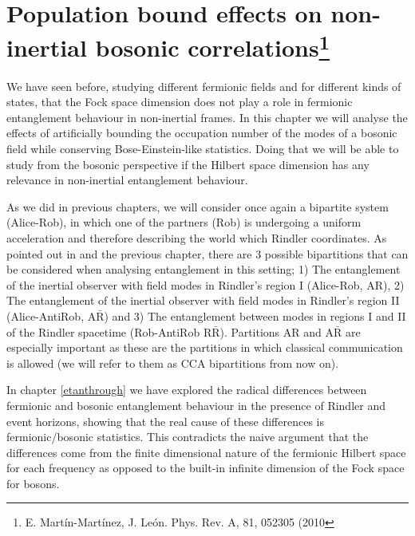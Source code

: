 

\chapter{Population bound effects on non-inertial bosonic correlations\footnote{E. Mart\'in-Mart\'inez, J. Le\'on. Phys. Rev. A, 81, 052305 (2010}}\label{boundedpop}


We have seen before, studying different fermionic fields and for different kinds of states, that the Fock space dimension does not play a role in fermionic entanglement behaviour in non-inertial frames. In this chapter we will analyse the effects of artificially bounding the occupation number of the modes of a bosonic field while conserving Bose-Einstein-like statistics. Doing that we will be able to study from the bosonic perspective if the Hilbert space dimension has any relevance in non-inertial entanglement behaviour.

As we did in previous chapters, we will consider once again a bipartite system (Alice-Rob), in which one of the partners (Rob) is undergoing a uniform acceleration and therefore describing the world which Rindler coordinates. As pointed out in \cite{AlsingSchul} and the previous chapter, there are 3 possible bipartitions that can be considered when analysing entanglement in this setting; 1) The entanglement of the inertial observer with field modes in Rindler's region I (Alice-Rob, AR), 2) The entanglement of the inertial observer with field modes in Rindler's region II (Alice-AntiRob, $\text{A}{\bar{\text{R}}}$) and 3) The entanglement between modes in regions I and II of the Rindler spacetime (Rob-AntiRob $\text{R}{\bar{\text{R}}}$). Partitions AR and $\text{A}{\bar{\text{R}}}$ are especially important as these are the partitions in which classical communication is allowed (we will refer to them as CCA bipartitions from now on).

In chapter \ref{etanthrough} we have explored the radical differences between fermionic and bosonic entanglement behaviour in the presence of Rindler and event horizons, showing that the real cause of these differences is fermionic/bosonic statistics. This contradicts the naive argument that the differences come from the finite dimensional nature of the fermionic Hilbert space for each frequency as opposed to the built-in infinite dimension of the Fock space for bosons.

